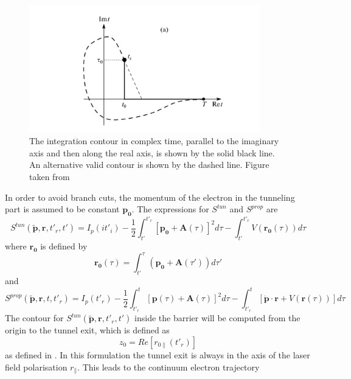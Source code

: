 \documentclass[11pt]{article}
\numberwithin{equation}{section}
\begin{document}
\begin{figure}[!htb]
    \centering
    \includegraphics[width = 10cm]{Figures/contour.png}
    \caption{The integration contour in complex time, parallel to the imaginary axis and then along the real axis, is shown by the solid black line. An alternative valid contour is shown by the dashed line. Figure taken from \cite{popruzhenko_2008_strong}}
    \label{fig:contour}
\end{figure}
\par
In order to avoid branch cuts, the momentum of the electron in the tunneling part is assumed to be constant $\mathbf{p_0}$. The expressions for $S^{tun}$ and $S^{prop}$ are
\begin{equation}\label{eq:Stun}
    S^{tun} (\tilde{\mathbf{p}}, \mathbf{r}, t'_r, t') = I_p(it'_i) - \frac{1}{2} \int_{t'}^{t'_r} [\mathbf{p_0} + \mathbf{A}(\tau)]^2 d\tau - \int_{t'}^{t'_r}V(\mathbf{r_0}(\tau))d\tau
\end{equation}
where $\mathbf{r_0}$ is defined by
\begin{equation}
    \mathbf{r_0}(\tau) = \int_{t'}^{\tau} (\mathbf{p_0} + \mathbf{A}(\tau'))d\tau'
\end{equation}
and
\begin{equation} \label{eq:Sprop}
    S^{prop} (\tilde{\mathbf{p}}, \mathbf{r}, t, t'_r) = I_p(t'_r) - \frac{1}{2} \int_{t'_r}^{t} [\mathbf{p}(\tau) + \mathbf{A}(\tau)]^2 d\tau - \int_{t'_r}^{t} [\mathbf{\dot{p}} \cdot \mathbf{r} + V(\mathbf{r}(\tau))] d\tau
\end{equation}
\newline
The contour for $S^{tun} (\tilde{\mathbf{p}}, \mathbf{r}, t'_r, t')$ inside the barrier will be computed from the origin to the tunnel exit, which is defined as
\begin{equation}
    z_0 = Re[r_{0\parallel}(t'_r)]
\end{equation}
as defined in \cite{oof}. In this formulation the tunnel exit is always in the axis of the laser field polarisation $r_\parallel$. This leads to the continuum electron trajectory
\end{document}
